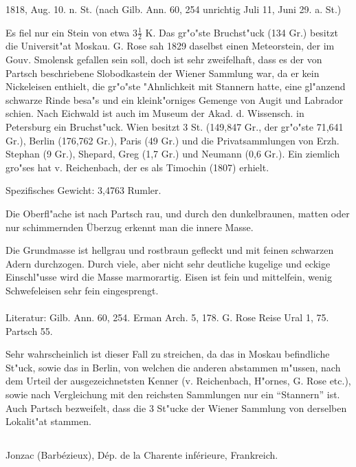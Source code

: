 \documentclass[a4paper, 11pt, oneside]{article}
\begin{document}
1818, Aug. 10. n. St. (nach Gilb. Ann. 60, 254 unrichtig Juli 11, Juni 29. a. St.)

Es fiel nur ein Stein von etwa $\mathfrak{3\frac{1}{2}}$ K. Das gr"o"ste Bruchst"uck (134 Gr.) besitzt die Universit"at Moskau. G. Rose sah 1829 daselbst einen Meteorstein, der im Gouv. Smolensk gefallen sein soll, doch ist sehr zweifelhaft, dass es der von Partsch beschriebene Slobodkastein der Wiener Sammlung war, da er kein Nickeleisen enthielt, die gr"o"ste "Ahnlichkeit mit Stannern hatte, eine gl"anzend schwarze Rinde besa"s und ein kleink"orniges Gemenge von Augit und Labrador schien. Nach Eichwald ist auch im Museum der Akad. d. Wissensch. in Petersburg ein Bruchst"uck. Wien besitzt 3 St. (149,847 Gr., der gr"o"ste 71,641 Gr.), Berlin (176,762 Gr.), Paris (49 Gr.) und die Privatsammlungen von Erzh. Stephan (9 Gr.), Shepard, Greg (1,7 Gr.) und Neumann (0,6 Gr.). Ein ziemlich gro"ses hat v. Reichenbach, der es als Timochin (1807) erhielt.

Spezifisches Gewicht: 3,4763 Rumler.

Die Oberfl"ache ist nach Partsch rau, und durch den dunkelbraunen, matten oder nur schimmernden Überzug erkennt man die innere Masse.

Die Grundmasse ist hellgrau und rostbraun gefleckt und mit feinen schwarzen Adern durchzogen. Durch viele, aber nicht sehr deutliche kugelige und eckige Einschl"usse wird die Masse marmorartig. Eisen ist fein und mittelfein, wenig Schwefeleisen sehr fein eingesprengt.
\normalsize
\paragraph{}
Literatur: Gilb. Ann. 60, 254. Erman Arch. 5, 178. G. Rose Reise Ural 1, 75. Partsch 55.

\LARGE
Sehr wahrscheinlich ist dieser Fall zu streichen, da das in Moskau befindliche St"uck, sowie das in Berlin, von welchen die anderen abstammen m"ussen, nach dem Urteil der ausgezeichnetsten Kenner (v. Reichenbach, H"ornes, G. Rose etc.), sowie nach Vergleichung mit den reichsten Sammlungen nur ein "`Stannern"' ist. Auch Partsch bezweifelt, dass die 3 St"ucke der Wiener Sammlung von derselben Lokalit"at stammen.
\subsection{}
\LARGE
\paragraph{}
Jonzac (Barbézieux), Dép. de la Charente inférieure, Frankreich.
\end{document}
